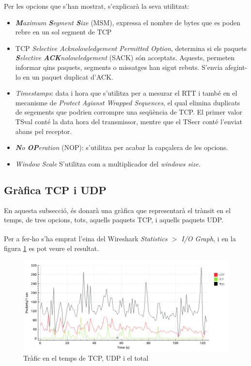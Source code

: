 \documentclass{article}
\begin{document}
Per les opcions que s'han mostrat, s'explicarà la seva utilitzat:
\begin{itemize}
\item \textit{\textbf{M}aximum \textbf{S}egment \textbf{S}ize} (MSM), expressa
el nombre de bytes que es poden rebre en un sol segment de TCP
\item TCP \textit{Selective Acknolowledgement Permitted Option},
determina si els paquets \textit{\textbf{S}elective \textbf{ACK}nolowledgement}
(SACK) són acceptats. Aquests, permeten informar qins paquets, segments o 
missatges han sigut rebuts. S'envia afegint-lo en un paquet duplicat d'ACK.
\item \textit{Timestamps}: data i hora 	que s'utilitza per a mesurar el
RTT i també en el mecanisme de \textit{Protect Agianst Wrapped Sequences},
el qual elimina duplicats de segements que podrien corrompre una seqüència de
TCP. El primer valor TSval conté la data  hora del transmissor, mentre que
el TSecr conté l'enviat abans pel receptor.
\item \textit{\textbf{N}o \textbf{OP}eration} (NOP): s'utilitza per acabar la
capçalera de les opcions.
\item \textit{Window Scale} S'utilitza com a multiplicador del \textit{windows
size}.
\end{itemize}
\subsection{Gràfica TCP i UDP}
En aquesta subsecció, és donarà una gràfica que representarà el trànsit en
el temps, de tres opcions, tots, aquells paquets TCP, i aquells paquets UDP.\\
\\
Per a fer-ho s'ha emprat l'eina del Wireshark \textit{Statistics $>$ I/O Graph},
i en la figura \ref{grp:traffic} es pot veure el resultat.
\begin{figure}[!h]
\centering
\includegraphics[scale=0.5]{grp.png}
\caption{Tràfic en el temps de TCP, UDP i el total}
\label{grp:traffic}
\end{figure}
\end{document}
